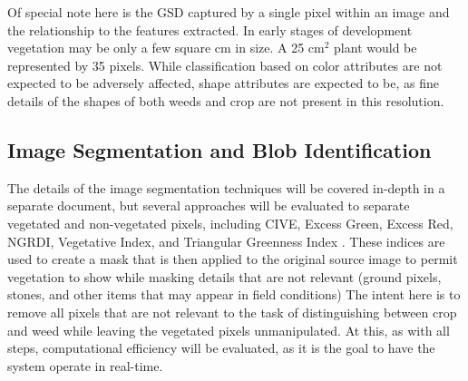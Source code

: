 \documentclass[12pt]{article}
\begin{document}
Of special note here is the GSD captured by a single pixel within an image and the relationship to the features extracted.  In early stages of development vegetation may be only a few square cm in size. A 25 cm$^2$ plant would be represented by 35 pixels. While classification based on color attributes are not expected to be adversely affected, shape attributes are expected to be, as fine details of the shapes of both weeds and crop are not present in this resolution.


\subsection{Image Segmentation and Blob Identification}
The details of the image segmentation techniques will be covered in-depth in a separate document, but several approaches will be evaluated to separate vegetated and non-vegetated pixels, including CIVE, Excess Green, Excess Red, NGRDI, Vegetative Index, and Triangular Greenness Index \parencite{Hunt2013-ih,Hamuda2016-dw}. These indices are used to create a mask that is then applied to the original source image to permit vegetation to show while masking details that are not relevant (ground pixels, stones, and other items that may appear in field conditions) The intent here is to remove all pixels that are not relevant to the task of distinguishing between crop and weed while leaving the vegetated pixels unmanipulated. At this, as with all steps, computational efficiency will be evaluated, as it is the goal to have the system operate in real-time.
\end{document}

